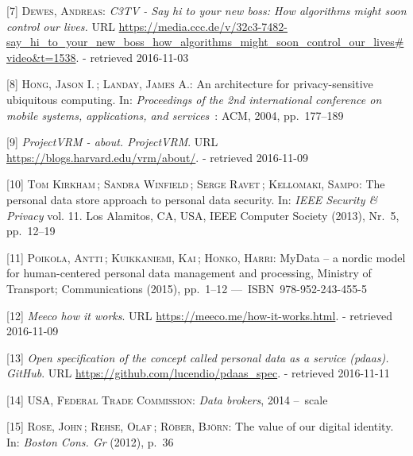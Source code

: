 \documentclass[12pt,english,a4paper,titlepage,cleardoublepage=empty,dottedtoc]{report}
\begin{document}
\hypertarget{ref-video_2015_big-data-and-deep-learning_discrimination}{}
{[}7{]} \textsc{Dewes, Andreas}: \emph{C3TV - Say hi to your new boss:
How algorithms might soon control our lives.} URL
\url{https://media.ccc.de/v/32c3-7482-say_hi_to_your_new_boss_how_algorithms_might_soon_control_our_lives\#video\&t=1538}.
- retrieved 2016-11-03

\hypertarget{ref-study_2004_architecture-for-privacy-sensitive-ubiquitous-computing}{}
{[}8{]} \textsc{Hong, Jason I.}\,; \textsc{Landay, James A.}: An
architecture for privacy-sensitive ubiquitous computing. In:
\emph{Proceedings of the 2nd international conference on mobile systems,
applications, and services}~: ACM, 2004, pp.~177--189

\hypertarget{ref-web_2010_projectvrm_about}{}
{[}9{]} \emph{ProjectVRM - about. ProjectVRM}. URL
\url{https://blogs.harvard.edu/vrm/about/}. - retrieved 2016-11-09

\hypertarget{ref-paper_2013_the-personal-data-store-approach-to-personal-data-security_2013}{}
{[}10{]} \textsc{Tom Kirkham}\,; \textsc{Sandra Winfield}\,;
\textsc{Serge Ravet}\,; \textsc{Kellomaki, Sampo}: The personal data
store approach to personal data security. In: \emph{IEEE Security \&
Privacy} vol. 11. Los Alamitos, CA, USA, IEEE Computer Society (2013),
Nr.~5, pp.~12--19

\hypertarget{ref-whitepaper_2014_mydata-a-nordic-model-for-human-centered-personal-data-management-and-processing}{}
{[}11{]} \textsc{Poikola, Antti}\,; \textsc{Kuikkaniemi, Kai}\,;
\textsc{Honko, Harri}: MyData -- a nordic model for human-centered
personal data management and processing, Ministry of Transport;
Communications (2015), pp.~1--12 ---~ISBN~978-952-243-455-5

\hypertarget{ref-web_2016_meeco-how-it-works}{}
{[}12{]} \emph{Meeco how it works}. URL
\url{https://meeco.me/how-it-works.html}. - retrieved 2016-11-09

\hypertarget{ref-repo_2016_pdaas-spec}{}
{[}13{]} \emph{Open specification of the concept called personal data as
a service (pdaas). GitHub}. URL
\url{https://github.com/lucendio/pdaas_spec}. - retrieved 2016-11-11

\hypertarget{ref-report_2014_data-brokers}{}
{[}14{]} \textsc{USA, Federal Trade Commission}: \emph{Data brokers},
2014 --~scale

\hypertarget{ref-whitepaper_2012_the-value-of-our-digital-identity_definition}{}
{[}15{]} \textsc{Rose, John}\,; \textsc{Rehse, Olaf}\,; \textsc{Röber,
Björn}: The value of our digital identity. In: \emph{Boston Cons. Gr}
(2012), p.~36
\end{document}
